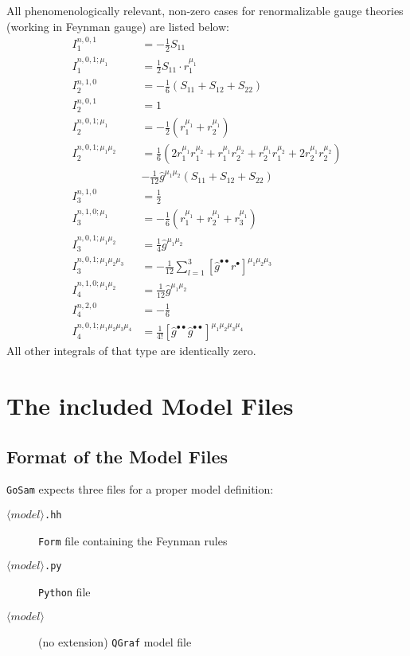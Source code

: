 \documentclass[11pt,a4paper]{refrep}
\newcommand{\golemversion}{{1{.}0}}
\newcommand{\golemv}[1][\golemversion]{{\tt GoSam}\xspace}
\newcommand{\qgraf}{{\tt QGraf}\xspace}
\newcommand{\form}{{\tt Form}\xspace}
\newcommand{\python}{{\tt Python}\xspace}
\begin{document}
All phenomenologically relevant, non-zero cases for renormalizable
gauge theories (working in Feynman gauge) are listed below:
\begin{align}
I_1^{n,0,1}&=-\frac12 S_{11}\\
I_1^{n,0,1;\mu_1}&=\frac12 S_{11} \cdot r_1^{\mu_1}\\
I_2^{n,1,0}&=-\frac16\left(S_{11}+S_{12}+S_{22}\right)\\
I_2^{n,0,1}&=1\\
I_2^{n,0,1;\mu_1}&=-\frac12\left(r_1^{\mu_1}+r_2^{\mu_1}\right)\\
I_2^{n,0,1;\mu_1\mu_2}&=
\frac16\left(%
2r_1^{\mu_1}r_1^{\mu_2}
+r_1^{\mu_1}r_2^{\mu_2}
+r_2^{\mu_1}r_1^{\mu_2}
+2r_2^{\mu_1}r_2^{\mu_2}\right)\nonumber\\
&-\frac1{12}\hat{g}^{\mu_1\mu_2}\left(S_{11}+S_{12}+S_{22}\right)\\
I_3^{n,1,0}&=\frac12\\
I_3^{n,1,0;\mu_1}&=-\frac16\left(r_1^{\mu_1}+r_2^{\mu_1}+r_3^{\mu_1}\right)\\
I_3^{n,0,1;\mu_1\mu_2}&=\frac14\hat{g}^{\mu_1\mu_2}\\
I_3^{n,0,1;\mu_1\mu_2\mu_3}&=-\frac{1}{12}
\sum_{l=1}^3\left[\hat{g}^{\bullet\bullet}r^{\bullet}\right]^{\mu_1\mu_2\mu_3}%
\\
I_4^{n,1,0;\mu_1\mu_2}&=\frac{1}{12}\hat{g}^{\mu_1\mu_2}\\
I_4^{n,2,0}&=-\frac16\\
I_4^{n,0,1;\mu_1\mu_2\mu_3\mu_4}&=\frac1{4!}\left[\hat{g}^{\bullet\bullet}%
\hat{g}^{\bullet\bullet}\right]^{\mu_1\mu_2\mu_3\mu_4}
\end{align}
All other integrals of that type are identically zero.



\chapter{The included Model Files}
\label{chp:model-files}

\section{Format of the Model Files}\label{sec:modelfiles}
\golemv{} expects three files for a proper model definition:
\begin{description}
\item[$\langle model\rangle$\texttt{.hh}] \form{} file containing the Feynman rules
\item[$\langle model\rangle$\texttt{.py}] \python{} file
\item[$\langle model\rangle$] (no extension) \qgraf{} model file
\end{description}
\end{document}
